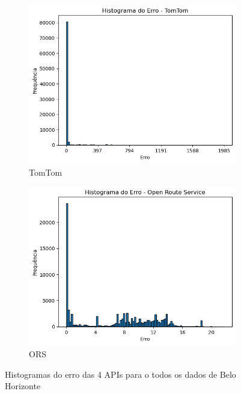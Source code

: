 \begin{figure}[ht]
  \begin{subfigure}[b]{0.45\textwidth}
    \includegraphics[width=\textwidth]{Figuras/histTomtomBH.png}
    \caption{TomTom}
    \label{fig:histtomtomB}
  \end{subfigure}
  \hfill
  \begin{subfigure}[b]{0.45\textwidth}
    \includegraphics[width=\textwidth]{Figuras/histOrsBH.png}
    \caption{ORS}
    \label{fig:historsB}
  \end{subfigure}
  
  \caption{Histogramas do erro das 4 APIs para o todos os dados de Belo Horizonte}
  \label{fig:hist-global-bh}
\end{figure}

